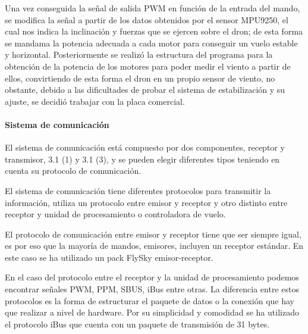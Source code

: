 Una vez conseguida la señal de salida PWM en función de la entrada del mando, se modifica la señal a partir de los datos obtenidos por el sensor MPU9250, el cual nos indica la inclinación y fuerzas que se ejercen sobre el dron; de esta forma se mandama la potencia adecuada a cada motor para conseguir un vuelo estable y horizontal. Posteriormente se realizó la estructura del programa para la obtención de la potencia de los motores para poder medir el viento a partir de ellos, convirtiendo de esta forma el dron en un propio sensor de viento, no obstante, debido a las dificultades de probar el sistema de estabilización y su ajuste, se decidió trabajar con la placa comercial.

\paragraph{Sistema de comunicación}

	El sistema de comunicación está compuesto por dos componentes, receptor y transmisor, 3.1 (1) y 3.1 (3), y se pueden elegir diferentes tipos teniendo en cuenta su protocolo de comunicación. 
	
	El sistema de comunicación tiene diferentes protocolos para transmitir la información, utiliza un protocolo entre emisor y receptor y otro distinto entre receptor y unidad de procesamiento o controladora de vuelo\cite{Eric2017}.
	
	
	El protocolo de comunicación entre emisor y receptor tiene que ser siempre igual, es por eso que la mayoría de mandos, emisores, incluyen un receptor estándar. En este caso se ha utilizado un pack FlySky emisor-receptor.
	
	En el caso del protocolo entre el receptor y la unidad de procesamiento podemos encontrar señales PWM, PPM, SBUS, iBus entre otras. La diferencia entre estos protocolos es la forma de estructurar el paquete de datos o la conexión que hay que realizar a nivel de hardware. Por su simplicidad y comodidad se ha utilizado el protocolo iBus que cuenta con un paquete de transmisión de 31 bytes.
	